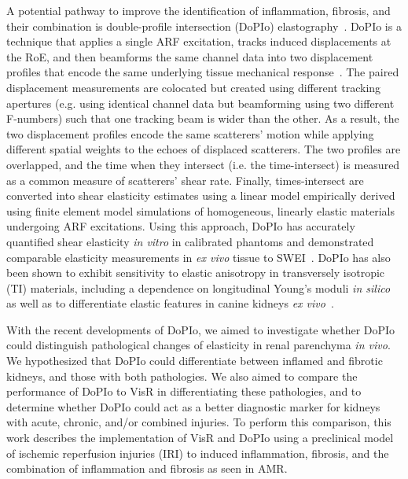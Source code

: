 A potential pathway to improve the identification of inflammation, fibrosis, and their combination is double-profile intersection (DoPIo) elastography~\cite{yokoyama_DoubleProfile_2025, yokoyama_Doubleprofile_2019}. DoPIo is a technique that applies a single ARF excitation, tracks induced displacements at the RoE, and then beamforms the same channel data into two displacement profiles that encode the same underlying tissue mechanical response~\cite{yokoyama_Quantitative_2022}. The paired displacement measurements are colocated but created using different tracking apertures (e.g. using identical channel data but beamforming using two different F-numbers) such that one tracking beam is wider than the other. As a result, the two displacement profiles encode the same scatterers' motion while applying different spatial weights to the echoes of displaced scatterers. The two profiles are overlapped, and the time when they intersect (i.e. the time-intersect) is measured as a common measure of scatterers' shear rate. Finally, times-intersect are converted into shear elasticity estimates using a linear model empirically derived using finite element model simulations of homogeneous, linearly elastic materials undergoing ARF excitations. Using this approach, DoPIo has accurately quantified shear elasticity \emph{in vitro} in calibrated phantoms and demonstrated comparable elasticity measurements in \emph{ex vivo} tissue to SWEI~\cite{yokoyama_Doubleprofile_2019,yokoyama_Assessing_2021}. DoPIo has also been shown to exhibit sensitivity to elastic anisotropy in transversely isotropic (TI) materials, including a dependence on longitudinal Young's moduli \emph{in silico}~\cite{muhtadi_Double_2025} as well as to differentiate elastic features in canine kidneys \emph{ex vivo}~\cite{yokoyama_Assessing_2021}.

With the recent developments of DoPIo, we aimed to investigate whether DoPIo could distinguish pathological changes of elasticity in renal parenchyma \emph{in vivo}. We hypothesized that DoPIo could differentiate between inflamed and fibrotic kidneys, and those with both pathologies. We also aimed to compare the performance of DoPIo to VisR in differentiating these pathologies, and to determine whether DoPIo could act as a better diagnostic marker for kidneys with acute, chronic, and/or combined injuries. To perform this comparison, this work describes the implementation of VisR and DoPIo using a preclinical model of ischemic reperfusion injuries (IRI) to induced inflammation, fibrosis, and the combination of inflammation and fibrosis as seen in AMR.